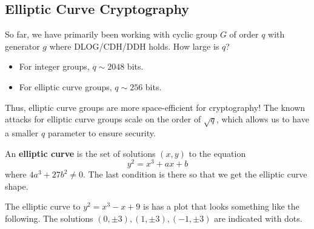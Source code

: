 \subsection{Elliptic Curve Cryptography}

So far, we have primarily been working with cyclic group $G$ of order $q$ with generator $g$ where DLOG/CDH/DDH holds. How large is $q$?
\begin{itemize}
    \item For integer groups, $q \sim 2048$ bits.
    \item For elliptic curve groups, $q \sim 256$ bits.
\end{itemize}
Thus, elliptic curve groups are more space-efficient for cryptography! The known attacks for elliptic curve groups scale on the order of $\sqrt{q}$, which allows us to have a smaller $q$ parameter to ensure security.

\begin{definition}
    An \textbf{elliptic curve} is the set of solutions $(x,y)$ to the equation
    $$y^2 = x^3 + ax + b$$
    where $4a^3 + 27b^2 \neq 0$. The last condition is there so that we get the elliptic curve shape.
\end{definition}

\begin{example}
    The elliptic curve to $y^2 = x^3 - x + 9$ is has a plot that looks something like the following. The solutions $(0, \pm 3), (1, \pm 3), (-1, \pm 3)$ are indicated with dots.

    \begin{center}
    \footnotesize
    \def\svgwidth{0.35\linewidth}
    
    \end{center}
\end{example}


